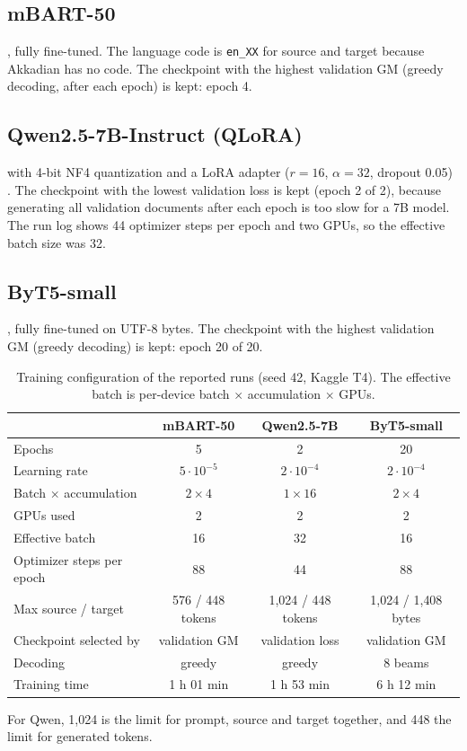 \documentclass[a4paper,12pt]{article}
\begin{document}
\subsection{mBART-50}
 \cite{mbart}, fully fine-tuned. The language code is \texttt{en\_XX} for source and target because Akkadian has no code. The checkpoint with the highest validation GM (greedy decoding, after each epoch) is kept: epoch 4.

\subsection{Qwen2.5-7B-Instruct (QLoRA)}
 \cite{qwen} with 4-bit NF4 quantization and a LoRA adapter ($r=16$, $\alpha=32$, dropout 0.05) \cite{lora,qlora}. The checkpoint with the lowest validation loss is kept (epoch 2 of 2), because generating all validation documents after each epoch is too slow for a 7B model. The run log shows 44 optimizer steps per epoch and two GPUs, so the effective batch size was 32.

\subsection{ByT5-small}
 \cite{byt5}, fully fine-tuned on UTF-8 bytes. The checkpoint with the highest validation GM (greedy decoding) is kept: epoch 20 of 20.

\begin{table}[H]
    \centering\small
    \caption{Training configuration of the reported runs (seed 42, Kaggle T4). The effective batch is per-device batch $\times$ accumulation $\times$ GPUs.}
    \label{tab:config}
    \begin{tabular}{lccc}
        \toprule
        & \textbf{mBART-50} & \textbf{Qwen2.5-7B} & \textbf{ByT5-small} \\
        \midrule
        Epochs & 5 & 2 & 20 \\
        Learning rate & $5\cdot10^{-5}$ & $2\cdot10^{-4}$ & $2\cdot10^{-4}$ \\
        Batch $\times$ accumulation & $2\times4$ & $1\times16$ & $2\times4$ \\
        GPUs used & 2 & 2 & 2 \\
        Effective batch & 16 & 32 & 16 \\
        Optimizer steps per epoch & 88 & 44 & 88 \\
        Max source / target & 576 / 448 tokens & 1{,}024 / 448 tokens & 1{,}024 / 1{,}408 bytes \\
        Checkpoint selected by & validation GM & validation loss & validation GM \\
        Decoding & greedy & greedy & 8 beams \\
        Training time & 1 h 01 min & 1 h 53 min & 6 h 12 min \\
        \bottomrule
    \end{tabular}

    \footnotesize For Qwen, 1{,}024 is the limit for prompt, source and target together, and 448 the limit for generated tokens.
\end{table}
\end{document}
